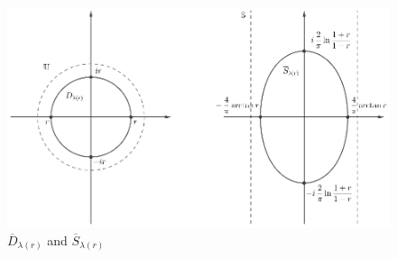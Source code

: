 \documentclass{amsart}
\begin{document}
\begin{figure}[H]
\includegraphics[width=\linewidth]{slika04v1.eps}
\caption{$\overline{D}_{\lambda(r)}$ and $\overline{S}_{\lambda(r)}$}\label{fig:1}
\end{figure}
\end{document}
